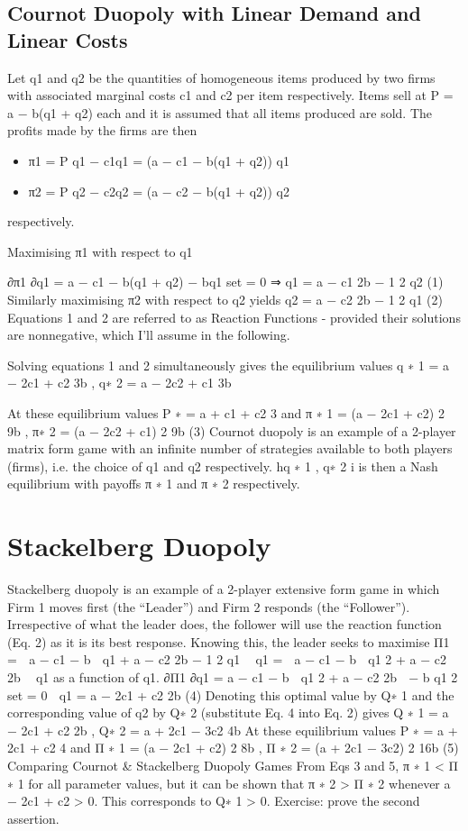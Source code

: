 \subsection{Cournot Duopoly with Linear Demand and Linear Costs}
Let q1 and q2 be the quantities of homogeneous items produced by two firms with associated
marginal costs c1 and c2 per item respectively.
Items sell at P = a − b(q1 + q2) each and it is assumed that all items produced are sold.
The profits made by the firms are then
\begin{itemize}
\item π1 = P q1 − c1q1 = (a − c1 − b(q1 + q2)) q1
\item π2 = P q2 − c2q2 = (a − c2 − b(q1 + q2)) q2
\end{itemize}
respectively.


Maximising π1 with respect to q1

∂π1
∂q1
= a − c1 − b(q1 + q2) − bq1
set = 0
⇒ q1 =
a − c1
2b
−
1
2
q2 (1)
Similarly maximising π2 with respect to q2 yields
q2 =
a − c2
2b
−
1
2
q1 (2)
Equations 1 and 2 are referred to as Reaction Functions - provided their solutions are
nonnegative, which I’ll assume in the following.

Solving equations 1 and 2 simultaneously gives the equilibrium values
q
∗
1 =
a − 2c1 + c2
3b
, q∗
2 =
a − 2c2 + c1
3b

At these equilibrium values
P
∗ =
a + c1 + c2
3
and
π
∗
1 =
(a − 2c1 + c2)
2
9b
, π∗
2 =
(a − 2c2 + c1)
2
9b
(3)
Cournot duopoly is an example of a 2-player matrix form game with an infinite number
of strategies available to both players (firms), i.e. the choice of q1 and q2 respectively.
hq
∗
1
, q∗
2
i is then a Nash equilibrium with payoffs π
∗
1
and π
∗
2
respectively.
\section{Stackelberg Duopoly}
Stackelberg duopoly is an example of a 2-player extensive form game in which Firm 1
moves first (the “Leader”) and Firm 2 responds (the “Follower”). Irrespective of what
the leader does, the follower will use the reaction function (Eq. 2) as it is its best response.
Knowing this, the leader seeks to maximise
Π1 =

a − c1 − b

q1 +
a − c2
2b
−
1
2
q1
 q1 =

a − c1 − b

q1
2
+
a − c2
2b
 q1
as a function of q1.
∂Π1
∂q1
= a − c1 − b

q1
2
+
a − c2
2b

− b
q1
2
set = 0
⇒ q1 =
a − 2c1 + c2
2b
(4)
Denoting this optimal value by Q∗
1
and the corresponding value of q2 by Q∗
2
(substitute
Eq. 4 into Eq. 2) gives
Q
∗
1 =
a − 2c1 + c2
2b
, Q∗
2 =
a + 2c1 − 3c2
4b
At these equilibrium values
P
∗ =
a + 2c1 + c2
4
and
Π
∗
1 =
(a − 2c1 + c2)
2
8b
, Π
∗
2 =
(a + 2c1 − 3c2)
2
16b
(5)
Comparing Cournot & Stackelberg Duopoly Games
From Eqs 3 and 5,
π
∗
1 < Π
∗
1
for all parameter values, but it can be shown that
π
∗
2 > Π
∗
2
whenever a − 2c1 + c2 > 0. This corresponds to Q∗
1 > 0.
Exercise: prove the second assertion.
